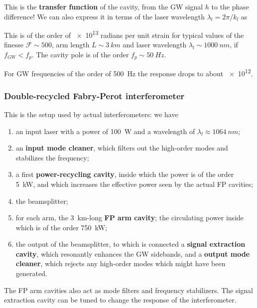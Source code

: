 \documentclass[main.tex]{subfiles}
\begin{document}
This is the \textbf{transfer function} of the cavity, from the GW signal \(h\) to the phase difference! We can also express it in terms of the laser wavelength \(\lambda_{l} = 2 \pi / k_l\) as 
%

This is of the order of \num{e13} radians per unit strain for typical values of the finesse \(\mathcal{F} \sim 500\), arm length \(L \sim \SI{3}{km}\) and laser wavelength \(\lambda_{l} \sim \SI{1000}{nm}\), if \(f_{GW} < f_p\). 
The cavity pole is of the order \(f_p \sim \SI{50}{Hz}\). 

For GW frequencies of the order of \SI{500}{Hz} the response drops to about \num{e12}. 

\subsubsection{Double-recycled Fabry-Perot interferometer}

This is the setup used by actual interferometers: we have 
\begin{enumerate}
    \item an input laser with a power of \SI{100}{W} and a wavelength of \(\lambda_{l} \approx \SI{1064}{nm}\); 
    \item an \textbf{input mode cleaner}, which filters out the high-order modes and stabilizes the frequency;
    \item a first \textbf{power-recycling cavity}, inside which the power is of the order \SI{5}{kW}, and which increases the effective power seen by the actual FP cavities;
    \item the beamsplitter;
    \item for each arm, the \SI{3}{km}-long \textbf{FP arm cavity}; the circulating power inside which is of the order \SI{750}{kW};
    \item the output of the beamsplitter, to which is connected a \textbf{signal extraction cavity}, which resonantly enhances the GW sidebands, and a \textbf{output mode cleaner}, which rejects any high-order modes which might have been generated.
\end{enumerate}
 
The FP arm cavities also act as mode filters and frequency stabilizers.
The signal extraction cavity can be tuned to change the response of the interferometer. 
\end{document}
